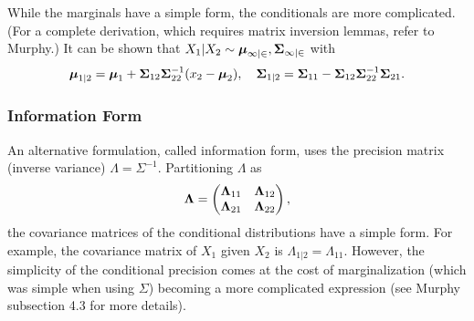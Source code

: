 \documentclass{article}
\begin{document}
While the marginals have a simple form, the conditionals are more complicated.  (For a complete derivation, which requires matrix inversion lemmas, refer to Murphy.) It can be shown that $ X_1|X_2 \sim \mathcal{\boldsymbol{\mu}_{1|2},\boldsymbol{\Sigma}_{1|2}}$ with
$$ \boldsymbol{\mu}_{1|2} = \boldsymbol{\mu}_1+\boldsymbol{\Sigma}_{12}\boldsymbol{\Sigma}_{22}^{-1}(x_2-\boldsymbol{\mu}_2), \quad
\boldsymbol{\Sigma}_{1|2} = \boldsymbol{\Sigma}_{11}-\boldsymbol{\Sigma}_{12}\boldsymbol{\Sigma}_{22}^{-1}\boldsymbol{\Sigma}_{21}.$$
\subsubsection{Information Form}
An alternative formulation, called information form, uses the precision matrix (inverse variance) $\Lambda = \Sigma^{-1}$. Partitioning $\Lambda$ as
$$ \boldsymbol{\Lambda} = \begin{pmatrix}
\boldsymbol{\Lambda}_{11} & \boldsymbol{\Lambda}_{12} \\
\boldsymbol{\Lambda}_{21} & \boldsymbol{\Lambda}_{22}
\end{pmatrix}, $$
the covariance matrices of the conditional distributions have a simple form. For example, the covariance matrix of $X_1$ given $X_2$ is $\Lambda_{1|2}=\Lambda_{11}$. However, the simplicity of the conditional precision comes at the cost of marginalization (which was simple when using $\Sigma$) becoming a more complicated expression (see Murphy subsection 4.3 for more details).
\end{document}
